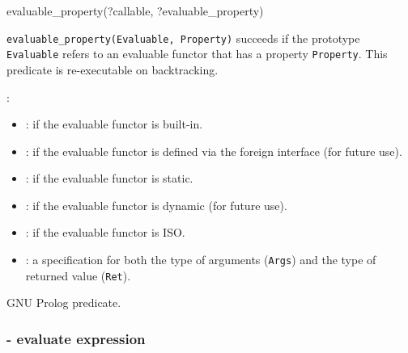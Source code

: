 \begin{TemplatesOneCol}
evaluable\_property(?callable, ?evaluable\_property)

\end{TemplatesOneCol}

\Description

\texttt{evaluable\_property(Evaluable, Property)} succeeds if the prototype
\texttt{Evaluable} refers to an evaluable functor that has a property
\texttt{Property}. This predicate is re-executable on backtracking.

:

\begin{itemize}

\item {}: if the evaluable functor is built-in.

\item {}: if the evaluable functor is defined via the foreign
  interface (for future use).

\item {}: if the evaluable functor is static.

\item {}: if the evaluable functor is dynamic (for future use).

\item {}: if the evaluable functor is ISO.

\item {}: a specification for both the type of
  arguments (\texttt{Args}) and the type of returned value (\texttt{Ret}).

\end{itemize}

\begin{PlErrors}



\end{PlErrors}

\Portability

GNU Prolog predicate.

\subsubsection{ - evaluate expression}

